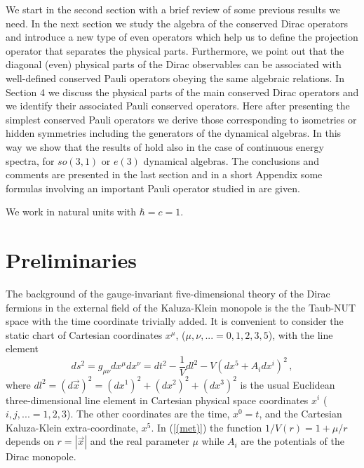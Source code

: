 \documentclass[a4paper,12pt]{article}
\begin{document}
We start in the second section with a brief review of some previous results 
\cite{CV2,CV3,CV4} we need. In the next section we study the algebra of the 
conserved Dirac operators and introduce a new type of even operators which 
help us to define the projection operator that separates the physical parts. 
Furthermore, we point out that the diagonal (even) physical parts  of the 
Dirac observables can be associated with well-defined conserved Pauli 
operators obeying the same algebraic relations. In Section 4 we 
discuss the physical parts of the main conserved Dirac operators 
\cite{CV2,CV3,CV4} and we identify their associated Pauli conserved 
operators. Here after presenting the simplest conserved Pauli operators 
we derive those corresponding to isometries or hidden symmetries including 
the generators of the dynamical algebras. In this way we show that the 
results of \cite{CV4} hold also in the case 
of continuous energy spectra, for $so(3,1)$ or $e(3)$ dynamical algebras.
The conclusions and  comments  are presented in the last section and
in a short Appendix some formulas involving an important Pauli operator 
studied in \cite{JMP,HMH} are given.      
 
We work in natural units with $\hbar=c=1$.

\section{Preliminaries}


The background of the gauge-invariant five-dimensional theory of the Dirac 
fermions in the external field of the Kaluza-Klein monopole \cite{GPS} is 
the the Taub-NUT space with the time coordinate trivially added. It is 
convenient to consider the static chart of Cartesian coordinates $x^{\mu}$, 
($\mu, \nu,...=0,1,2,3,5$), with the line element
\begin{equation}\label{(met)} 
ds^{2}=g_{\mu\nu}dx^{\mu}dx^{\nu}=dt^{2}-\frac{1}{V}dl^{2}-V(dx^{5}+
A_{i}dx^{i})^{2}\,,
\end{equation}   
where $dl^{2}=(d\vec{x})^{2}=(dx^{1})^{2}+(dx^{2})^{2}+(dx^{3})^{2}$
is the usual Euclidean three-dimensional line element in  
Cartesian physical space coordinates $x^{i}$ ($i,j,...=1,2,3$). 
The other coordinates are the time, $x^{0}=t$, and 
the Cartesian Kaluza-Klein extra-coordinate, $x^{5}$. 
In (\ref{(met)}) the function $1/V(r)=1+\mu/r$ 
depends on $r=|\vec{x}|$ and the  
real parameter  $\mu$ while $A_{i}$ are the potentials of the Dirac 
monopole.  
\end{document}
